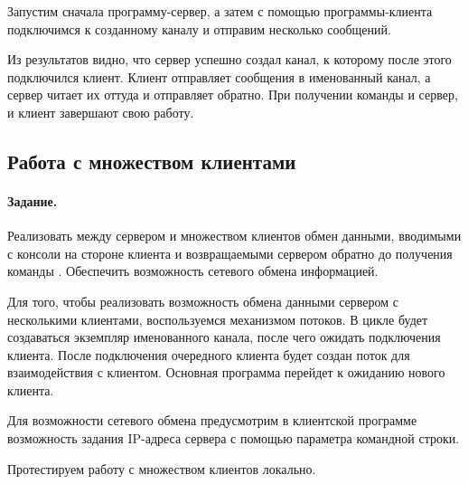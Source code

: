 Запустим сначала программу-сервер, а затем с помощью программы-клиента подключимся к созданному каналу и отправим несколько сообщений.





Из результатов видно, что сервер успешно создал канал, к которому после этого подключился клиент. Клиент отправляет сообщения в именованный канал, а сервер читает их оттуда и отправляет обратно. При получении команды  и сервер, и клиент завершают свою работу.

\subsection{Работа с множеством клиентами}

\paragraph{Задание.} Реализовать между сервером и множеством клиентов обмен данными, вводимыми с консоли на стороне клиента и возвращаемыми сервером обратно до получения команды . Обеспечить возможность сетевого обмена информацией.

Для того, чтобы реализовать возможность обмена данными сервером с несколькими клиентами, воспользуемся механизмом потоков. В цикле будет создаваться экземпляр именованного канала, после чего ожидать подключения клиента. После подключения очередного клиента будет создан поток для взаимодействия с клиентом. Основная программа перейдет к ожиданию нового клиента.

Для возможности сетевого обмена предусмотрим в клиентской программе возможность задания IP-адреса сервера с помощью параметра командной строки.





Протестируем работу с множеством клиентов локально.







